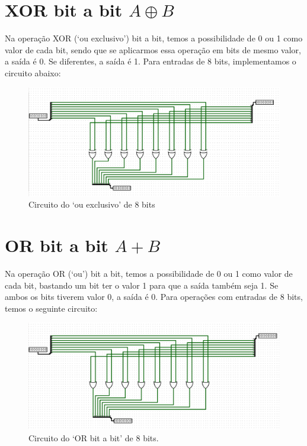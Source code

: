 \documentclass[
	12pt,				%
	openright,			%
	twoside,			%
	a4paper,			%
	english,			%
	french,				%
	spanish,			%
	brazil,				%
	]{abntex2}
\begin{document}
\section{XOR bit a bit \texorpdfstring{$A \oplus B$}{Lg}}
Na operação XOR (‘ou exclusivo’) bit a bit, temos a possibilidade de 0 ou 1 como valor de cada bit, sendo que se aplicarmos essa operação em bits de mesmo valor, a saída é 0. Se diferentes, a saída é 1. Para entradas de 8 bits, implementamos o circuito abaixo:

\begin{figure}[H]
	\begin{center}
	    \includegraphics[scale=0.4]{xorcircuito.png}
	\end{center}
\caption{\label{xor}Circuito do ‘ou exclusivo’ de 8 bits}
\end{figure}

\section{OR bit a bit \texorpdfstring{$A+B$}{Lg}}

Na operação OR (‘ou’) bit a bit, temos a possibilidade de 0 ou 1 como valor de cada bit, bastando um bit ter o valor 1 para que a saída também seja 1. Se ambos os bits tiverem valor 0, a saída é 0. Para operações com entradas de 8 bits, temos o seguinte circuito:

\begin{figure}[H]
	\begin{center}
	    \includegraphics[scale=0.4]{orcircuito.png}
	\end{center}
\caption{\label{or}Circuito do ‘OR bit a bit’ de 8 bits.}
\end{figure}
\end{document}
